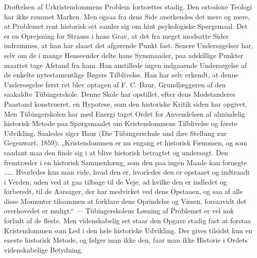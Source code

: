 \documentclass[12pt,a4paper,openany]{book}
\newcommand{\opage}[1]{\marginnote{\footnotesize\textit{[#1]}}}
\begin{document}
Drøftelsen af Urkristendommens Problem fortsættes stadig. Den
ortodoxe Teologi har ikke rømmet Marken. Men ogsaa fra dens
Side anerkendes det mere og mere, at Problemet rent historisk set
samler sig om hint psykologiske Spørgsmaal. Det er en Oprejsning
for Strauss i hans Grav, at det fra meget modsatte Sider indrømmes,
at han har slaaet det afgørende Punkt fast. Senere Undersøgelser
\opage{131}har, selv om de i mange Henseender delte hans Synsmaader, paa
adskillige Punkter maattet tage Afstand fra ham. Han anstillede ingen
indgaaende Undersøgelse af de enkelte nytestamentlige Bøgers
Tilblivelse. Han har selv erkendt, at denne Undersøgelse først ret
blev optagen af F. C. Baur, Grundlæggeren af den saakaldte Tübingerskole.
Denne Skole har opstillet, efter dens Modstanderes Paastand
konstrueret, en Hypotese, som den historiske Kritik siden har
opgivet. Men Tübingerskolen har med Energi taget Ordet for Anvendelsen
af almindelig historisk Metode paa Spørgsmaalet om Kristendommens
Tilblivelse og første Udvikling. Saaledes siger Baur
(Die Tübingerschule und ihre Stellung zur Gegenwart. 1859): „Kristendommen
er nu engang et historisk Fænomen, og som saadant
maa den finde sig i at blive historisk betragtet og undersøgt. Den
fremtræder i en historisk Sammenhæng, som den paa ingen Maade
kan fornegte ..... Hvorledes kan man vide, hvad den er, hvorledes
den er opstaaet og indtraadt i Verden, uden ved at gaa tilbage til de
Veje, ad hvilke den er indledet og forberedt, til de Aarsager, der har
medvirket ved dens Opstaaen, og saa af alle disse Momenter tilsammen
at forklare dens Oprindelse og Væsen, forsaavidt det overhovedet
er muligt.“ --- Tübingerskolens Løsning af Problemet er vel nok
forladt af de fleste. Men videnskabelig set staar den Opgave stadig
fast at forstaa Kristendommen som Led i den hele historiske Udvikling.
Der gives tilsidst kun en eneste historisk Metode, og følger man
ikke den, faar man ikke Historie i Ordets videnskabelige Betydning.
\end{document}
